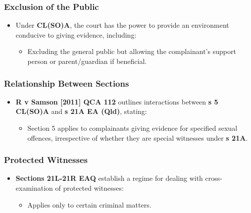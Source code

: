 \subsubsection{Exclusion of the Public}\label{exclusion-of-the-public}

\begin{itemize}
\tightlist
\item
  Under \textbf{CL(SO)A}, the court has the power to provide an
  environment conducive to giving evidence, including:

  \begin{itemize}
  \tightlist
  \item
    Excluding the general public but allowing the complainant's support
    person or parent/guardian if beneficial.
  \end{itemize}
\end{itemize}

\subsubsection{Relationship Between
Sections}\label{relationship-between-sections}

\begin{itemize}
\tightlist
\item
  \textbf{R v Samson {[}2011{]} QCA 112} outlines interactions between
  \textbf{s 5 CL(SO)A} and \textbf{s 21A EA (Qld)}, stating:

  \begin{itemize}
  \tightlist
  \item
    Section 5 applies to complainants giving evidence for specified
    sexual offences, irrespective of whether they are special witnesses
    under \textbf{s 21A}.
  \end{itemize}
\end{itemize}

\subsubsection{Protected Witnesses}\label{protected-witnesses}

\begin{itemize}
\tightlist
\item
  \textbf{Sections 21L-21R EAQ} establish a regime for dealing with
  cross-examination of protected witnesses:

  \begin{itemize}
  \tightlist
  \item
    Applies only to certain criminal matters.
  \end{itemize}
\end{itemize}

